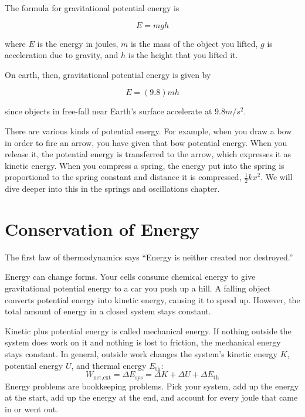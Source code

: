\begin{mdframed}[style=important, frametitle={Formula for Gravitational Potential Energy}]
The formula for gravitational potential energy is

\[
E = mgh
\]

where $E$ is the energy in joules, $m$ is the mass of the object you
lifted, $g$ is acceleration due to gravity, and $h$ is the height that you lifted it.

On earth, then, gravitational potential energy is given by

\[
E = (9.8)mh
\]

since objects in free-fall near Earth's surface accelerate at $9.8 m/s^2$.

\end{mdframed}


There are various kinds of potential energy. For example, when you draw a bow in 
order to fire an arrow, you have given that bow potential energy. When you release it, the potential energy is transferred to the arrow, which expresses it as kinetic energy. When you compress a spring, the energy put into the spring is proportional to the spring constant and distance it is compressed, $\frac{1}{2} kx^2$. We will dive deeper into this in the springs and oscillations chapter.


\section{Conservation of Energy}

The first law of thermodynamics says ``Energy is neither created nor destroyed.''

Energy can change forms. Your cells consume chemical energy to give gravitational potential energy to a car you push up a hill. A falling object converts potential energy into kinetic energy, causing it to speed up. However, the total amount of energy in a closed system stays constant. 

Kinetic plus potential energy is called mechanical energy. If nothing outside the system does work on it and nothing is lost to friction, the mechanical energy stays constant. In general, outside work changes the system's kinetic energy $K$, potential energy $U$, and thermal energy $E_\text{th}$:
\[
W_\text{net,ext}=\Delta E_\text{sys}=\Delta K+\Delta U+\Delta E_\text{th}
\]
Energy problems are bookkeeping problems. Pick your system, add up the energy at the start, add up the energy at the end, and account for every joule that came in or went out.

